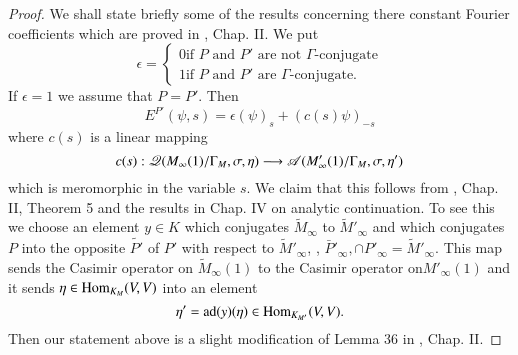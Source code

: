 \begin{proof}
We shall state briefly some of the results concerning there constant Fourier coefficients which are proved in \cite{art5-key8}, Chap. II. We put
$$
\epsilon = 
\begin{cases}
0 \text{if $P$ and $P'$ are not $\Gamma$-conjugate}\\
1 \text{if $P$ and $P'$ are $\Gamma$-conjugate.}
\end{cases}
$$
If $\epsilon =1$ we assume that $P = P'$. Then
$$
E^{P'} (\psi, s) =\epsilon (\psi)_s + (c (s) \psi)_{-s}
$$
where $c(s)$ is a linear mapping
$$
c(s) : \mathscr{Q} (M_\infty (1)/ \Gamma_M, \sigma, \eta) \longrightarrow \mathscr{A} (M'_\infty (1)/ \Gamma_M, \sigma, \eta')
$$ 
which is meromorphic in the variable $s$. We claim that this follows from \cite{art5-key8}, Chap. II, Theorem 5 and the results in Chap. IV on analytic continuation. To see this we choose  an element $y \in K$ which conjugates $\tilde{M}_\infty$ to $\tilde{M}'_{\infty}$ and which conjugates $P$ into the opposite $\tilde{P'}$ of $P'$ with respect to $\tilde{M}'_\infty$, \ie, $\bar{P}'_\infty, \cap P'_\infty = \tilde{M}'_\infty$. This map sends the Casimir operator on $\tilde{M}_\infty (1)$ to the Casimir operator on$M'_\infty (1)$ and it sends $\eta \in \operatorname{Hom}_{K_M} (V, V)$ into an element
$$
\eta' = \operatorname{ad} (y) (\eta) \in \operatorname{Hom}_{K_{M'}} (V, V).
$$
Then our statement above is a slight modification of Lemma 36 in \cite{art5-key8}, Chap. II.


\end{proof}

